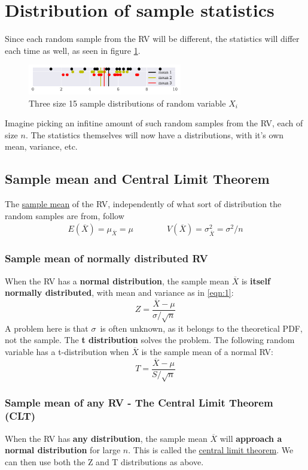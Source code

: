 \documentclass[12p,a4paper]{report}
\renewcommand{\bar}{\overline}
\begin{document}
\section*{Distribution of sample statistics}
Since each random sample from the RV will be different, the statistics will differ each time as well, as seen in figure \ref{fig:2}.
\begin{figure}[H]
    \centering
    \includegraphics[width=0.6\textwidth]{figs/RV:2.pdf}
    \caption{Three size 15 sample distributions of random variable $X_i$}
    \label{fig:2}
\end{figure}
Imagine picking an infitine amount of such random samples from the RV, each of size $n$. The statistics themselves will now have a distributions, with it's own mean, variance, etc.

\subsection*{Sample mean and Central Limit Theorem}
The \underline{sample mean} of the RV, independently of what sort of distribution the random samples are from, follow
\begin{align}\label{eqn:1}
    E(\bar{X}) = \mu_{\bar{X}} = \mu \quad\quad\quad\quad V(\bar{X}) = \sigma_{\bar{X}}^2 = \sigma^2/n
\end{align}

\subsubsection*{Sample mean of normally distributed RV}
When the RV has a \textbf{normal distribution}, the sample mean $\bar{X}$ is \textbf{itself normally distributed}, with mean and variance as in \ref{eqn:1}:
\[
    Z = \frac{\bar{X} - \mu}{\sigma/\sqrt{n}}
\]
A problem here is that $\sigma$ is often unknown, as it belongs to the theoretical PDF, not the sample.
The \textbf{t distribution} solves the problem. The following random variable has a t-distribution when $\bar{X}$ is the sample mean of a normal RV:
\[
    T = \frac{\bar{X} - \mu}{S/\sqrt{n}}
\]

\subsubsection*{Sample mean of any RV - The Central Limit Theorem (CLT)}
When the RV has \textbf{any distribution}, the sample mean $\bar{X}$ will \textbf{approach a normal distribution} for large $n$. This is called the \underline{central limit theorem}. We can then use both the Z and T distributions as above.
\end{document}
